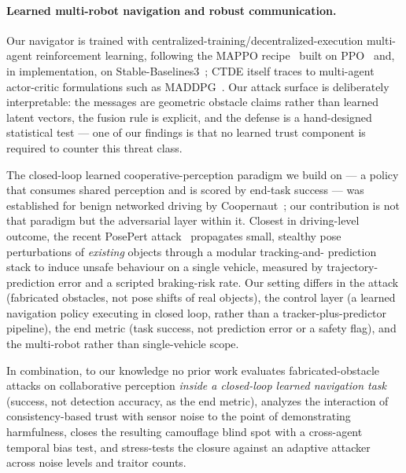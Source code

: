 \paragraph{Learned multi-robot navigation and robust communication.}
Our navigator is trained with centralized-training/decentralized-execution
multi-agent reinforcement learning, following the MAPPO
recipe~\cite{yu2022mappo} built on PPO~\cite{schulman2017ppo} and, in
implementation, on Stable-Baselines3~\cite{raffin2021sb3}; CTDE itself
traces to multi-agent actor-critic formulations such as
MADDPG~\cite{lowe2017maddpg}. Our attack surface is deliberately
interpretable: the messages are geometric obstacle claims rather than
learned latent vectors, the fusion rule is explicit, and the defense is a
hand-designed statistical test --- one of our findings is that no learned
trust component is required to counter this threat class.

The closed-loop learned cooperative-perception paradigm we build on --- a
policy that consumes shared perception and is scored by end-task success ---
was established for benign networked driving by
Coopernaut~\cite{coopernaut2022}; our contribution is not that paradigm but
the adversarial layer within it. Closest in driving-level outcome, the recent
PosePert attack~\cite{stealthyfab2026} propagates small, stealthy pose
perturbations of \emph{existing} objects through a modular tracking-and-
prediction stack to induce unsafe behaviour on a single vehicle, measured by
trajectory-prediction error and a scripted braking-risk rate. Our setting
differs in the attack (fabricated obstacles, not pose shifts of real objects),
the control layer (a learned navigation policy executing in closed loop, rather
than a tracker-plus-predictor pipeline), the end metric (task success, not
prediction error or a safety flag), and the multi-robot rather than
single-vehicle scope.

In combination, to our knowledge no prior work evaluates
fabricated-obstacle attacks on collaborative perception \emph{inside a
closed-loop learned navigation task} (success, not detection accuracy, as
the end metric), analyzes the interaction of consistency-based trust with
sensor noise to the point of demonstrating harmfulness, closes the
resulting camouflage blind spot with a cross-agent temporal bias test, and
stress-tests the closure against an adaptive attacker across noise levels
and traitor counts.

